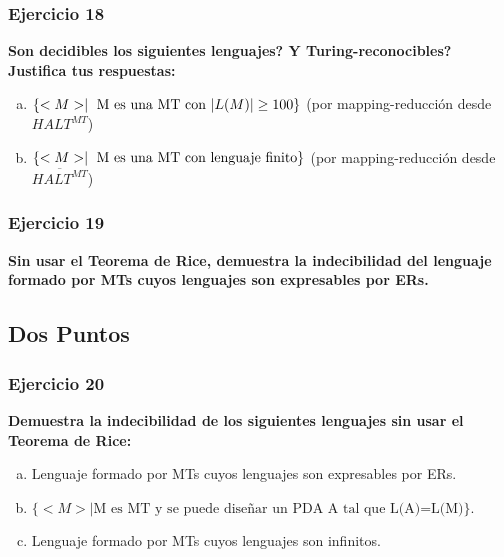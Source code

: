 \documentclass{article}
\begin{document}
 
 \subsubsection*{Ejercicio 18}
\textbf{Son decidibles los siguientes lenguajes? Y Turing-reconocibles? Justifica tus respuestas:}
\begin{enumerate}[a)]
 \item $\{<M> \mid \hbox{ M es una MT con } |L(M)| \geq 100\}$ (por mapping-reducción desde $HALT^{MT}$)

\item $\{<M> \mid \hbox{ M es una MT con lenguaje finito}  \}$ (por mapping-reducción desde $\overline{HALT^{MT}}$)

\end{enumerate}
%
 \subsubsection*{Ejercicio 19} 
\textbf{Sin usar el Teorema de Rice, demuestra la indecibilidad del lenguaje formado por MTs  cuyos lenguajes son expresables por ERs.}

\subsection{Dos Puntos}
\label{sec:dospuntos}
\subsubsection*{Ejercicio 20} 
\textbf{Demuestra la indecibilidad de los siguientes lenguajes sin usar el Teorema de Rice:}
\begin{enumerate}[a)]
\item Lenguaje formado por MTs  cuyos lenguajes son expresables por ERs.
\item $\{<M> \mid \mbox{M es MT y  se puede diseñar  un PDA A tal que L(A)=L(M)}\}$.
\item Lenguaje formado por MTs  cuyos lenguajes son infinitos.
\end{enumerate}
\end{document}
